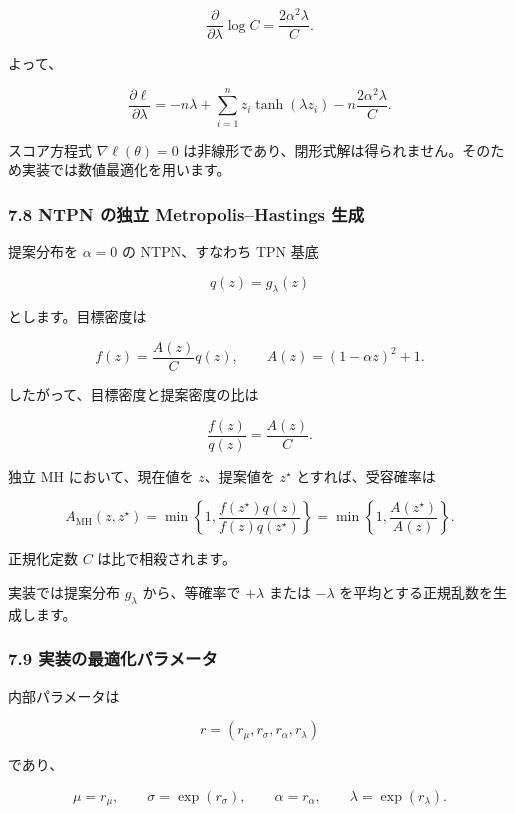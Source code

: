 \documentclass[
]{article}
\begin{document}
\[
\frac{\partial}{\partial\lambda}\log C
=\frac{2\alpha^2\lambda}{C}.
\]

よって、

\[
\frac{\partial \ell}{\partial \lambda}
=-n\lambda+
\sum_{i=1}^{n}z_i\tanh(\lambda z_i)
-n\frac{2\alpha^2\lambda}{C}.
\]

スコア方程式 \(\nabla\ell(\theta)=0\)
は非線形であり、閉形式解は得られません。そのため実装では数値最適化を用います。

\hypertarget{ntpn-ux306eux72ecux7acb-metropolishastings-ux751fux6210}{%
\subsubsection{7.8 NTPN の独立 Metropolis--Hastings
生成}\label{ntpn-ux306eux72ecux7acb-metropolishastings-ux751fux6210}}

提案分布を \(\alpha=0\) の NTPN、すなわち TPN 基底

\[
q(z)=g_\lambda(z)
\]

とします。目標密度は

\[
f(z)=\frac{A(z)}{C}q(z),
\qquad
A(z)=(1-\alpha z)^2+1.
\]

したがって、目標密度と提案密度の比は

\[
\frac{f(z)}{q(z)}=\frac{A(z)}{C}.
\]

独立 MH において、現在値を \(z\)、提案値を \(z^\star\)
とすれば、受容確率は

\[
A_{\mathrm{MH}}(z,z^\star)
=\min\left\{1,
\frac{f(z^\star)q(z)}{f(z)q(z^\star)}
\right\}
=\min\left\{1,
\frac{A(z^\star)}{A(z)}
\right\}.
\]

正規化定数 \(C\) は比で相殺されます。

実装では提案分布 \(g_\lambda\) から、等確率で \(+\lambda\) または
\(-\lambda\) を平均とする正規乱数を生成します。

\hypertarget{ux5b9fux88c5ux306eux6700ux9069ux5316ux30d1ux30e9ux30e1ux30fcux30bf-3}{%
\subsubsection{7.9
実装の最適化パラメータ}\label{ux5b9fux88c5ux306eux6700ux9069ux5316ux30d1ux30e9ux30e1ux30fcux30bf-3}}

内部パラメータは

\[
r=(r_\mu,r_\sigma,r_\alpha,r_\lambda)
\]

であり、

\[
\mu=r_\mu,
\qquad
\sigma=\exp(r_\sigma),
\qquad
\alpha=r_\alpha,
\qquad
\lambda=\exp(r_\lambda).
\]
\end{document}
